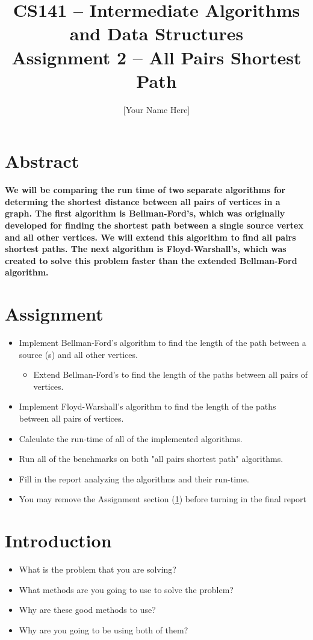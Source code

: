\documentclass[twocolumn]{article}
\title{CS141 -- Intermediate Algorithms and Data Structures\\Assignment 2 -- All
Pairs Shortest Path}
\author{[Your Name Here]}
\date{}
\begin{document}
\maketitle

\section*{Abstract}
\textbf{\small We will be comparing the run time of two separate algorithms for determing the shortest distance between
all pairs of vertices in a graph. The first algorithm is Bellman-Ford's, which was originally developed for
finding the shortest path between a single source vertex and all other vertices. We will extend this algorithm to find
all pairs shortest paths. The next algorithm is Floyd-Warshall's, which was created to solve this problem faster than
the extended Bellman-Ford algorithm.}

\section{Assignment}
\label{sec::assignment}
\begin{itemize}
    \item Implement Bellman-Ford's algorithm to find the length of the path between a source (s) and all other vertices.
    \begin{itemize}
        \item Extend Bellman-Ford's to find the length of the paths between all pairs of vertices.
    \end{itemize}
    \item Implement Floyd-Warshall's algorithm to find the length of the paths between all pairs of vertices.
    \item Calculate the run-time of all of the implemented algorithms.
    \item Run all of the benchmarks on both "all pairs shortest path" algorithms.
    \item Fill in the report analyzing the algorithms and their run-time.
    \item You may remove the Assignment section (\cref{sec::assignment}) before turning in the final report
\end{itemize}

\section{Introduction}
\begin{itemize}
    \item What is the problem that you are solving?
    \item What methods are you going to use to solve the problem?
    \item Why are these good methods to use?
    \item Why are you going to be using both of them?
\end{itemize}
\end{document}
